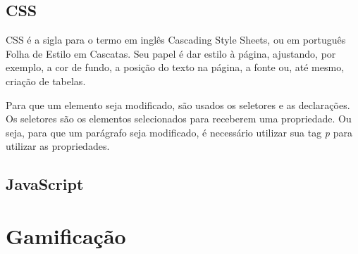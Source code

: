\subsection{CSS}
CSS é a sigla para o termo em inglês Cascading Style Sheets, ou em português Folha de Estilo em Cascatas. Seu papel é dar estilo à página, ajustando, por exemplo, a cor de fundo, a posição do texto na página, a fonte ou, até mesmo, criação de tabelas.

Para que um elemento seja modificado, são usados os seletores e as declarações. Os seletores são os elementos selecionados para receberem uma propriedade. Ou seja, para que um parágrafo seja modificado, é necessário utilizar sua tag \textit{p} para utilizar as propriedades.


\subsection{JavaScript}

\section{Gamificação}